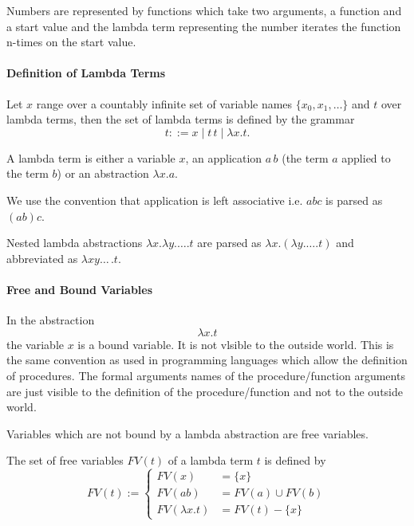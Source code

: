 Numbers are represented by functions which take two arguments, a function and
a start value and the lambda term representing the number iterates the
function n-times on the start value.



\paragraph{Definition of Lambda Terms}

\begin{definition}
  Let $x$ range over a countably infinite set of variable names
  $\{x_0, x_1, \ldots\}$ and $t$ over lambda terms, then the set of lambda
  terms is defined by the grammar $$t ::= x \mid t\, t \mid \lambda x. t.$$
\end{definition}

A lambda term is either a variable $x$, an application $a\,b$ (the term $a$
applied to the term $b$) or an abstraction $\lambda x.a$.

We use the convention that application is left associative i.e. $a b c$ is
parsed as $(a b) c$.

Nested lambda abstractions $\lambda x. \lambda y. \ldots . t$
are parsed as $\lambda x. (\lambda y. \ldots . t)$ and
abbreviated as $\lambda x y \ldots\, . t$.


\paragraph{Free and Bound Variables}

In the abstraction $$ \lambda x. t$$ the variable $x$ is a bound variable. It
is not vlsible to the outside world. This is the same convention as used in
programming languages which allow the definition of procedures. The formal
arguments names of the procedure/function arguments are just visible to the
definition of the procedure/function and not to the outside world.

Variables which are not bound by a lambda abstraction are free variables.

\begin{definition}
  The set of free variables $FV(t)$ of a lambda term $t$ is defined by
  $$FV(t) :=
  \begin{cases} FV(x) &= \{x\} \\
     FV(a b) &= FV(a) \cup FV(b) \\
     FV(\lambda x. t) &= FV(t) - \{x\}
   \end{cases}
   $$
\end{definition}

